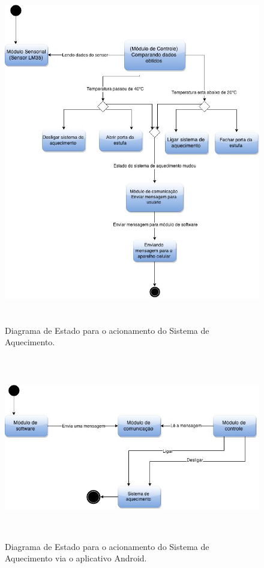 \documentclass{report}
\begin{document}
    \begin{figure}[H]
	 \includegraphics[width=\linewidth, height = 15cm]{pictures/sistema_aquecimento_estado.jpg}
	 \caption{Diagrama de Estado para o acionamento do Sistema de Aquecimento.}
	 \label{figure:sa_hw}
	\end{figure}
	
   \begin{figure}[H]
	 \includegraphics[height = 8cm, width = \linewidth]{pictures/sistema_aquecimento_estado_sw.jpg}
	 \caption{Diagrama de Estado para o acionamento do Sistema de Aquecimento via o aplicativo Android.}
	 \label{figure:sa_sw}
	\end{figure}
  
\end{document}
